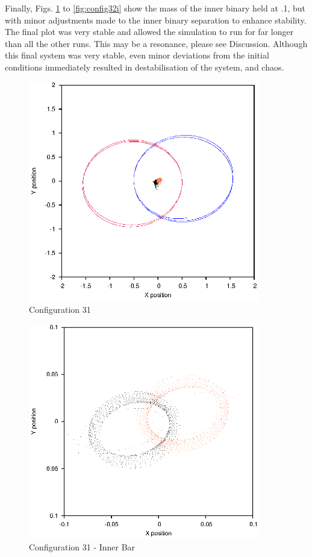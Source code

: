\documentclass[a4paper,12pt]{article}
\begin{document}
Finally, Figs. \ref{fig:config31} to \ref{fig:config32i} show the mass of the inner binary held at .1, but with minor adjustments made to the inner binary separation to enhance stability.
The final plot was very stable and allowed the simulation to run for far longer than all the other runs. This may be a resonance, please see Discussion. Although this final system was
very stable, even minor deviations from the initial conditions immediately resulted in destabilisation of the system, and chaos.
\begin{figure}[H]
\centering
\includegraphics[width=0.9\textwidth]{./2017results/1-1-102-1/Orbit.eps}
\caption{Configuration 31}
\label{fig:config31}
\end{figure}
\begin{figure}[H]
\centering
\includegraphics[width=0.9\textwidth]{./2017results/1-1-102-1/Inner.eps}
\caption{Configuration 31 - Inner Bar}
\label{fig:config31i}
\end{figure}
\end{document}
